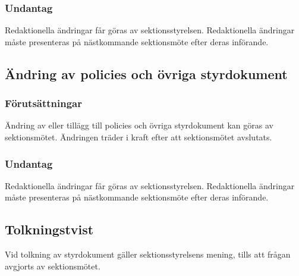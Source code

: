 \subsubsection{Undantag}
Redaktionella ändringar får göras av sektionsstyrelsen. Redaktionella ändringar måste presenteras på nästkommande sektionsmöte efter deras införande.

\subsection{Ändring av policies och övriga styrdokument}
\subsubsection{Förutsättningar}
Ändring av eller tillägg till policies och övriga styrdokument kan göras av sektionsmötet. Ändringen träder i kraft efter att sektionsmötet avslutats.

\subsubsection{Undantag}
Redaktionella ändringar får göras av sektionsstyrelsen. Redaktionella ändringar måste presenteras på nästkommande sektionsmöte efter deras införande.

\subsection{Tolkningstvist}
Vid tolkning av styrdokument gäller sektionsstyrelsens mening, tills att frågan avgjorts av sektionsmötet.
